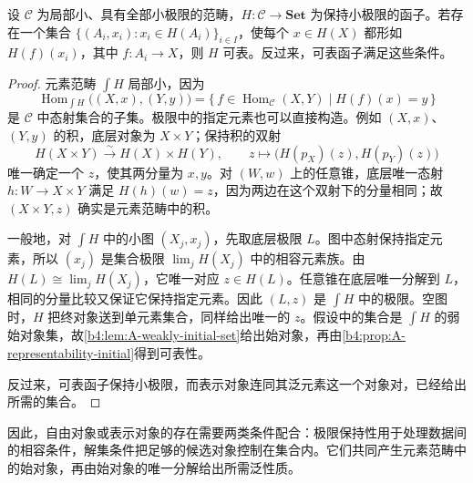 \begin{corollary}\label{b4:cor:A-representability-solution-set}
	设 \(\mathcal C\) 为局部小、具有全部小极限的范畴，\(H:\mathcal C\to\mathbf{Set}\) 为保持小极限的函子。若存在一个集合 \(\bigl\{(A_i,x_i):x_i\in H(A_i)\bigr\}_{i\in I}\)，使每个 \(x\in H(X)\) 都形如 \(H(f)(x_i)\)，其中 \(f:A_i\to X\)，则 \(H\) 可表。反过来，可表函子满足这些条件。
\end{corollary}
\begin{proof}
	元素范畴 \(\int H\) 局部小，因为
	\[
		\operatorname{Hom}_{\int H}\bigl((X,x),(Y,y)\bigr) =\{\,f\in\operatorname{Hom}_{\mathcal C}(X,Y)\mid H(f)(x)=y\,\}
	\]
	是 \(\mathcal C\) 中态射集合的子集。极限中的指定元素也可以直接构造。例如 \((X,x)\)、\((Y,y)\) 的积，底层对象为 \(X\times Y\)；保持积的双射
	\[
		H(X\times Y)\xrightarrow{\sim}H(X)\times H(Y), \qquad z\longmapsto\bigl(H(p_X)(z),H(p_Y)(z)\bigr)
	\]
	唯一确定一个 \(z\)，使其两分量为 \(x,y\)。对 \((W,w)\) 上的任意锥，底层唯一态射 \(h:W\to X\times Y\) 满足 \(H(h)(w)=z\)，因为两边在这个双射下的分量相同；故 \((X\times Y,z)\) 确实是元素范畴中的积。

	一般地，对 \(\int H\) 中的小图 \((X_j,x_j)\)，先取底层极限 \(L\)。图中态射保持指定元素，所以 \((x_j)\) 是集合极限 \(\lim_j H(X_j)\) 中的相容元素族。由 \(H(L)\cong\lim_jH(X_j)\)，它唯一对应 \(z\in H(L)\)。任意锥在底层唯一分解到 \(L\)，相同的分量比较又保证它保持指定元素。因此 \((L,z)\) 是 \(\int H\) 中的极限。空图时，\(H\) 把终对象送到单元素集合，同样给出唯一的 \(z\)。假设中的集合是 \(\int H\) 的弱始对象集，故\cref{b4:lem:A-weakly-initial-set}给出始对象，再由\cref{b4:prop:A-representability-initial}得到可表性。

	反过来，可表函子保持小极限，而表示对象连同其泛元素这一个对象对，已经给出所需的集合。
\end{proof}

因此，自由对象或表示对象的存在需要两类条件配合：极限保持性用于处理数据间的相容条件，解集条件把足够的候选对象控制在集合内。它们共同产生元素范畴中的始对象，再由始对象的唯一分解给出所需泛性质。
